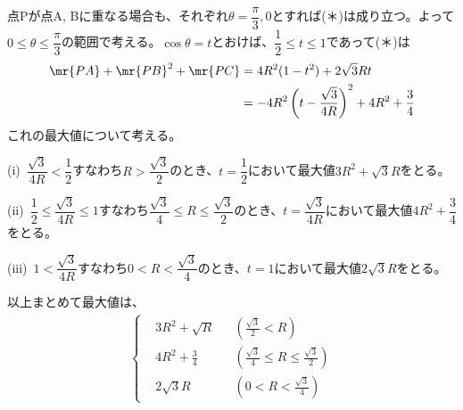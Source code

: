 点Pが点A, Bに重なる場合も、それぞれ$\theta=\dfrac{\pi}{3}, 0$とすれば(＊)は成り立つ。よって$0\le\theta\le\dfrac{\pi}{3}$の範囲で考える。$\cos\theta=t$とおけば、$\dfrac{1}{2}\le t\le 1$であって(＊)は
\begin{align*}
 \mr{PA}+\mr{PB}^2+\mr{PC}&=4R^2(1-t^2)+2\sqrt{3}Rt \\
 &=-4R^2\left(t-\frac{\sqrt{3}}{4R}\right)^2+4R^2+\frac{3}{4}
\end{align*}
これの最大値について考える。

(i)~$\dfrac{\sqrt{3}}{4R}<\dfrac{1}{2}$すなわち$R>\dfrac{\sqrt{3}}{2}$のとき、$t=\dfrac{1}{2}$において最大値$3R^2+\sqrt{3}R$をとる。

(ii)~$\dfrac{1}{2}\le \dfrac{\sqrt{3}}{4R}\le 1$すなわち$\dfrac{\sqrt{3}}{4}\le R\le \dfrac{\sqrt{3}}{2}$のとき、$t=\dfrac{\sqrt{3}}{4R}$において最大値$4R^2+\dfrac{3}{4}$をとる。

(iii)~$1<\dfrac{\sqrt{3}}{4R}$すなわち$0<R<\dfrac{\sqrt{3}}{4}$のとき、$t=1$において最大値$2\sqrt{3}R$をとる。

以上まとめて最大値は、
\begin{align*}
 \left\{
 \begin{aligned}
  &3R^2+\sqrt{R} & &\left(\frac{\sqrt{3}}{2}<R\right) \\
  &4R^2+\frac{3}{4} & &\left(\frac{\sqrt{3}}{4}\le R\le \frac{\sqrt{3}}{2}\right) \\
  &2\sqrt{3}R & &\left(0<R<\frac{\sqrt{3}}{4}\right)
 \end{aligned} \right.
\end{align*}
